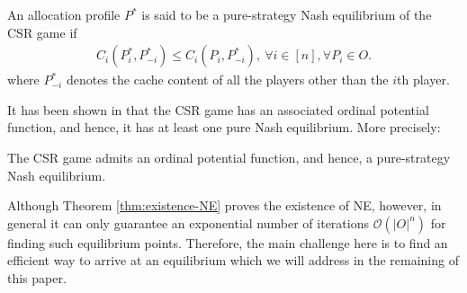 
\begin{definition}
An allocation profile $P^*$ is said to be a pure-strategy Nash equilibrium of the CSR game if 
\begin{align}\nonumber
C_i(P^*_i,P^*_{-i})\leq C_i(P_i,P^*_{-i}), \ \forall i\in[n], \forall P_i\in O.
\end{align}
where $P^*_{-i}$ denotes the cache content of all the players other than the $i$th player.
\end{definition}

It has been shown in \cite{gopalakrishnan2012cache} that the CSR game has an associated ordinal potential function, and hence, it has at least one pure Nash equilibrium. More precisely:

\begin{theorem}\label{thm:existence-NE}
The CSR game admits an ordinal potential function, and hence, a pure-strategy Nash equilibrium.
\end{theorem}

Although Theorem \ref{thm:existence-NE} proves the existence of NE, however, in general it can only guarantee an exponential number of iterations $\mathcal{O}(|O|^n)$ for finding such equilibrium points. Therefore, the main challenge here is to find an efficient way to arrive at an equilibrium which we will address in the remaining of this paper.
